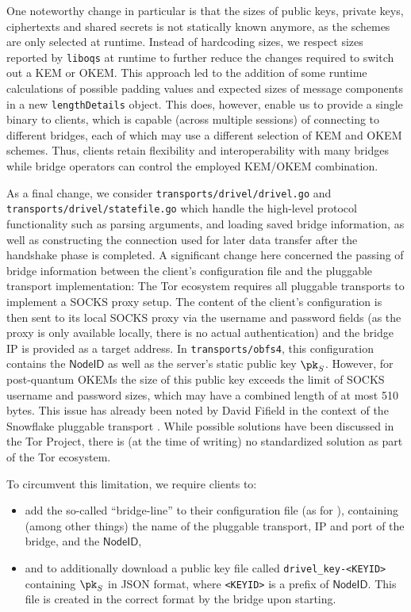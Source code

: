 One noteworthy change in particular is that the sizes of public keys, private keys, ciphertexts and shared secrets is not statically known anymore, as the schemes are only selected at runtime.
Instead of hardcoding sizes, we respect sizes reported by \texttt{liboqs} at runtime to further reduce the changes required to switch out a KEM or OKEM.
This approach led to the addition of some runtime calculations of possible padding values and expected sizes of message components in a new \texttt{lengthDetails} object.
This does, however, enable us to provide a single binary to clients, which is capable (across multiple sessions) of connecting to different bridges, each of which may use a different selection of KEM and OKEM schemes. Thus, clients retain flexibility and interoperability with many bridges while bridge operators can control the employed KEM/OKEM combination.

As a final change, we consider \texttt{transports/drivel/drivel.go} and \texttt{transports/drivel/statefile.go} which handle the high-level protocol functionality such as parsing arguments, and loading saved bridge information, as well as constructing the connection used for later data transfer after the handshake phase is completed.
A significant change here concerned the passing of bridge information between the client's configuration file and the pluggable transport implementation: The Tor ecosystem requires all pluggable transports to implement a SOCKS proxy setup. The content of the client's configuration is then sent to its local SOCKS proxy via the username and password fields (as the proxy is only available locally, there is no actual authentication) and the bridge IP is provided as a target address. In \texttt{transports/obfs4}, this configuration contains the $\mathsf{NodeID}$ as well as the server's static public key $\pk_S$. However, for post-quantum OKEMs the size of this public key exceeds the limit of SOCKS username and password sizes, which may have a combined length of at most 510 bytes. This issue has already been noted by David Fifield in the context of the Snowflake pluggable transport \cite{torprojectSnowflakeBridge}. While possible solutions have been discussed in the Tor Project, there is (at the time of writing) no standardized solution as part of the Tor ecosystem.

To circumvent this limitation, we require clients to:
\begin{itemize}
    \item add the so-called ``bridge-line'' to their configuration file (as for \obfsfour{}), containing (among other things) the name of the pluggable transport, IP and port of the bridge, and the $\mathsf{NodeID}$,
    \item and to additionally download a public key file called \texttt{drivel\_key-<KEYID>} containing $\pk_S$ in JSON format, where \texttt{<KEYID>} is a prefix of $\mathsf{NodeID}$. This file is created in the correct format by the bridge upon starting.
\end{itemize}

